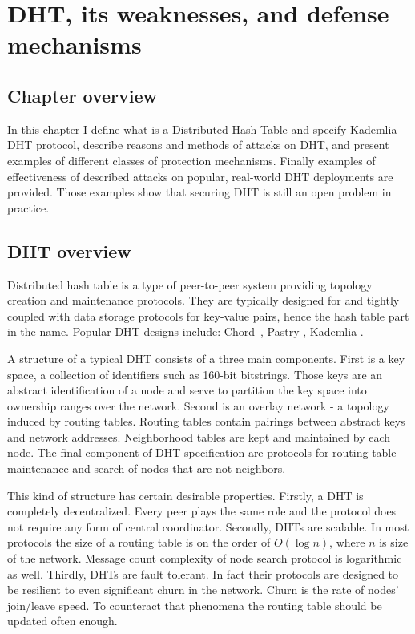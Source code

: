 \chapter{DHT, its weaknesses, and defense mechanisms}
\label{ch:threats}
\section{Chapter overview}
  In this chapter I define what is a Distributed Hash Table and specify Kademlia
  DHT protocol, describe reasons and methods of attacks on DHT, and present
  examples of different classes of protection mechanisms. Finally examples of
  effectiveness of described attacks on popular, real-world DHT deployments are
  provided. Those examples show that securing DHT is still an open problem in
  practice.

\section{DHT overview}

  Distributed hash table is a type of peer-to-peer system providing topology
  creation and maintenance protocols. They are typically designed for and
  tightly coupled with data storage protocols for key-value pairs, hence the
  hash table part in the name. Popular DHT designs include: Chord~\cite{sto03},
  Pastry \cite{row01}, Kademlia \cite{may02}.

  A structure of a typical DHT consists of a three main components. First is a
  key space, a collection of identifiers such as 160-bit bitstrings. Those keys
  are an abstract identification of a node and serve to partition the key space
  into ownership ranges over the network. Second is an overlay network - a
  topology induced by routing tables. Routing tables contain pairings between
  abstract keys and network addresses. Neighborhood tables are kept and
  maintained by each node. The final component of DHT specification are
  protocols for routing table maintenance and search of nodes that are not
  neighbors.

  This kind of structure has certain desirable properties. Firstly, a DHT is
  completely decentralized. Every peer plays the same role and the protocol does
  not require any form of central coordinator. Secondly, DHTs are scalable. In
  most protocols the size of a routing table is on the order of $O(\log n)$,
  where $n$ is size of the network. Message count complexity of node search
  protocol is logarithmic as well. Thirdly, DHTs are fault tolerant. In fact
  their protocols are designed to be resilient to even significant churn in the
  network. Churn is the rate of nodes' join/leave speed. To counteract that
  phenomena the routing table should be updated often enough.
 
